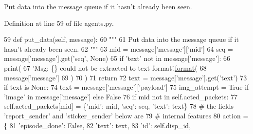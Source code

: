 \begin{DoxyVerb}Put data into the message queue if it hasn't already been seen.
\end{DoxyVerb}
 

Definition at line 59 of file agents.\+py.


\begin{DoxyCode}
59     \textcolor{keyword}{def }put\_data(self, message):
60         \textcolor{stringliteral}{"""}
61 \textcolor{stringliteral}{        Put data into the message queue if it hasn't already been seen.}
62 \textcolor{stringliteral}{        """}
63         mid = message[\textcolor{stringliteral}{'message'}][\textcolor{stringliteral}{'mid'}]
64         seq = message[\textcolor{stringliteral}{'message'}].get(\textcolor{stringliteral}{'seq'}, \textcolor{keywordtype}{None})
65         \textcolor{keywordflow}{if} \textcolor{stringliteral}{'text'} \textcolor{keywordflow}{not} \textcolor{keywordflow}{in} message[\textcolor{stringliteral}{'message'}]:
66             print(
67                 \textcolor{stringliteral}{'Msg: \{\} could not be extracted to text format'}.\hyperlink{namespaceparlai_1_1chat__service_1_1services_1_1messenger_1_1shared__utils_a32e2e2022b824fbaf80c747160b52a76}{format}(
68                     message[\textcolor{stringliteral}{'message'}]
69                 )
70             )
71             \textcolor{keywordflow}{return}
72         text = message[\textcolor{stringliteral}{'message'}].get(\textcolor{stringliteral}{'text'})
73         \textcolor{keywordflow}{if} text \textcolor{keywordflow}{is} \textcolor{keywordtype}{None}:
74             text = message[\textcolor{stringliteral}{'message'}][\textcolor{stringliteral}{'payload'}]
75         img\_attempt = \textcolor{keyword}{True} \textcolor{keywordflow}{if} \textcolor{stringliteral}{'image'} \textcolor{keywordflow}{in} message[\textcolor{stringliteral}{'message'}] \textcolor{keywordflow}{else} \textcolor{keyword}{False}
76         \textcolor{keywordflow}{if} mid \textcolor{keywordflow}{not} \textcolor{keywordflow}{in} self.acted\_packets:
77             self.acted\_packets[mid] = \{\textcolor{stringliteral}{'mid'}: mid, \textcolor{stringliteral}{'seq'}: seq, \textcolor{stringliteral}{'text'}: text\}
78             \textcolor{comment}{# the fields 'report\_sender' and 'sticker\_sender' below are}
79             \textcolor{comment}{# internal features}
80             action = \{
81                 \textcolor{stringliteral}{'episode\_done'}: \textcolor{keyword}{False},
82                 \textcolor{stringliteral}{'text'}: text,
83                 \textcolor{stringliteral}{'id'}: self.disp\_id,

\end{DoxyCode}
